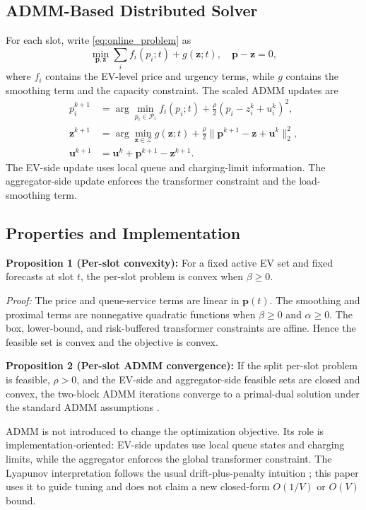 \documentclass[journal]{IEEEtran}
\begin{document}
\subsection{ADMM-Based Distributed Solver}
For each slot, write \eqref{eq:online_problem} as
\begin{equation}
\min_{\mathbf p,\mathbf z} \sum_i f_i(p_i;t)+g(\mathbf z;t),
\quad \mathbf p-\mathbf z=0,
\label{eq:admm_split}
\end{equation}
where $f_i$ contains the EV-level price and urgency terms, while $g$ contains the smoothing term and the capacity constraint. The scaled ADMM updates are
\begin{align}
p_i^{k+1} &=
\arg\min_{p_i\in\mathcal P_i}
f_i(p_i;t)+\frac{\rho}{2}(p_i-z_i^k+u_i^k)^2, \label{eq:admm_p}\\
\mathbf z^{k+1} &=
\arg\min_{\mathbf z\in\mathcal Z}
g(\mathbf z;t)+\frac{\rho}{2}\|\mathbf p^{k+1}-\mathbf z+\mathbf u^k\|_2^2, \label{eq:admm_z}\\
\mathbf u^{k+1} &= \mathbf u^k+\mathbf p^{k+1}-\mathbf z^{k+1}. \label{eq:admm_u}
\end{align}
The EV-side update uses local queue and charging-limit information. The aggregator-side update enforces the transformer constraint and the load-smoothing term.

\subsection{Properties and Implementation}
\textbf{Proposition 1 (Per-slot convexity):}
For a fixed active EV set and fixed forecasts at slot $t$, the per-slot problem is convex when $\beta\ge0$.

\emph{Proof:}
The price and queue-service terms are linear in $\mathbf p(t)$. The smoothing and proximal terms are nonnegative quadratic functions when $\beta\ge0$ and $\alpha\ge0$. The box, lower-bound, and risk-buffered transformer constraints are affine. Hence the feasible set is convex and the objective is convex.

\textbf{Proposition 2 (Per-slot ADMM convergence):}
If the split per-slot problem is feasible, $\rho>0$, and the EV-side and aggregator-side feasible sets are closed and convex, the two-block ADMM iterations converge to a primal-dual solution under the standard ADMM assumptions \cite{Boyd2011,Eckstein1992}.

ADMM is not introduced to change the optimization objective. Its role is implementation-oriented: EV-side updates use local queue states and charging limits, while the aggregator enforces the global transformer constraint. The Lyapunov interpretation follows the usual drift-plus-penalty intuition \cite{Neely2010}; this paper uses it to guide tuning and does not claim a new closed-form $O(1/V)$ or $O(V)$ bound.
\end{document}
